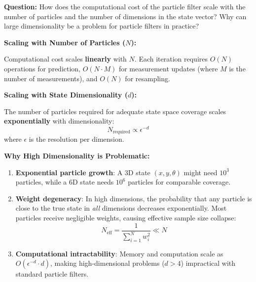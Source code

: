\documentclass[12pt]{article}
\begin{document}
\noindent\textbf{Question:} How does the computational cost of the particle filter scale with the number of particles and the number of dimensions in the state vector? Why can large dimensionality be a problem for particle filters in practice?

\vspace{0.5cm}

\noindent\textbf{Scaling with Number of Particles ($N$):}

Computational cost scales \textbf{linearly} with $N$. Each iteration requires $O(N)$ operations for prediction, $O(N \cdot M)$ for measurement updates (where $M$ is the number of measurements), and $O(N)$ for resampling.

\vspace{0.5cm}

\noindent\textbf{Scaling with State Dimensionality ($d$):}

The number of particles required for adequate state space coverage scales \textbf{exponentially} with dimensionality:
\[
N_{\text{required}} \propto \epsilon^{-d}
\]
where $\epsilon$ is the resolution per dimension.

\vspace{0.5cm}

\noindent\textbf{Why High Dimensionality is Problematic:}

\begin{enumerate}
    \item \textbf{Exponential particle growth}: A 3D state $(x, y, \theta)$ might need $10^3$ particles, while a 6D state needs $10^6$ particles for comparable coverage.
    
    \item \textbf{Weight degeneracy}: In high dimensions, the probability that any particle is close to the true state in \textit{all} dimensions decreases exponentially. Most particles receive negligible weights, causing effective sample size collapse:
    \[
    N_{\text{eff}} = \frac{1}{\sum_{i=1}^{N} w_i^2} \ll N
    \]
    
    \item \textbf{Computational intractability}: Memory and computation scale as $O(\epsilon^{-d} \cdot d)$, making high-dimensional problems ($d > 4$) impractical with standard particle filters.
\end{enumerate}
\end{document}
